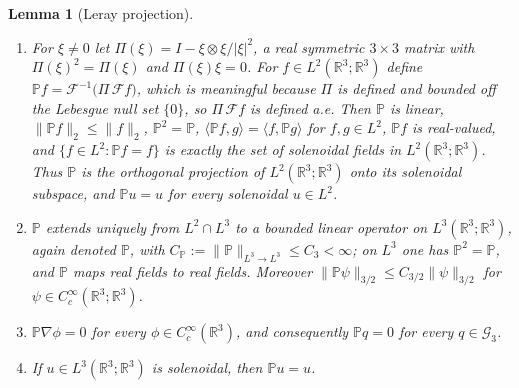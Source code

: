 \documentclass[11pt]{article}
\newtheorem{lemma}[theorem]{Lemma}
\theoremstyle{definition}
\theoremstyle{plain}
\newcommand{\R}{\mathbb R}
\newcommand{\norm}[1]{\lVert #1\rVert}
\begin{document}
\begin{lemma}[Leray projection]\label{lem:leray}\leavevmode
\begin{enumerate}
\item[(a)] For $\xi\ne0$ let $\Pi(\xi)=I-\xi\otimes\xi/|\xi|^2$, a real
 symmetric $3\times3$ matrix with $\Pi(\xi)^2=\Pi(\xi)$ and
 $\Pi(\xi)\xi=0$.  For $f\in L^2(\R^3;\R^3)$ define
 $\mathbb Pf=\mathcal F^{-1}\bigl(\Pi\,\mathcal Ff\bigr)$, which is
 meaningful because $\Pi$ is defined and bounded off the Lebesgue null set
 $\{0\}$, so $\Pi\,\mathcal Ff$ is defined a.e.  Then
 $\mathbb P$ is linear, $\norm{\mathbb Pf}_2\le\norm f_2$,
 $\mathbb P^2=\mathbb P$, $\langle\mathbb Pf,g\rangle=\langle f,\mathbb Pg\rangle$
 for $f,g\in L^2$, $\mathbb Pf$ is real-valued, and
 $\{f\in L^2:\mathbb Pf=f\}$ is exactly the set of solenoidal fields in
 $L^2(\R^3;\R^3)$.  Thus $\mathbb P$ is the orthogonal projection of
 $L^2(\R^3;\R^3)$ onto its solenoidal subspace, and $\mathbb Pu=u$ for
 every solenoidal $u\in L^2$.
\item[(b)] $\mathbb P$ extends uniquely from $L^2\cap L^3$ to a bounded
 linear operator on $L^3(\R^3;\R^3)$, again denoted $\mathbb P$, with
 $C_{\mathbb P}:=\norm{\mathbb P}_{L^3\to L^3}\le C_3<\infty$; on $L^3$
 one has $\mathbb P^2=\mathbb P$, and $\mathbb P$ maps real fields to
 real fields.  Moreover $\norm{\mathbb P\psi}_{3/2}\le C_{3/2}\norm\psi_{3/2}$
 for $\psi\in C_c^\infty(\R^3;\R^3)$.
\item[(c)] $\mathbb P\nabla\phi=0$ for every $\phi\in C_c^\infty(\R^3)$,
 and consequently $\mathbb Pq=0$ for every $q\in\mathcal G_3$.
\item[(d)] If $u\in L^3(\R^3;\R^3)$ is solenoidal, then $\mathbb Pu=u$.
\end{enumerate}
\end{lemma}
\end{document}
